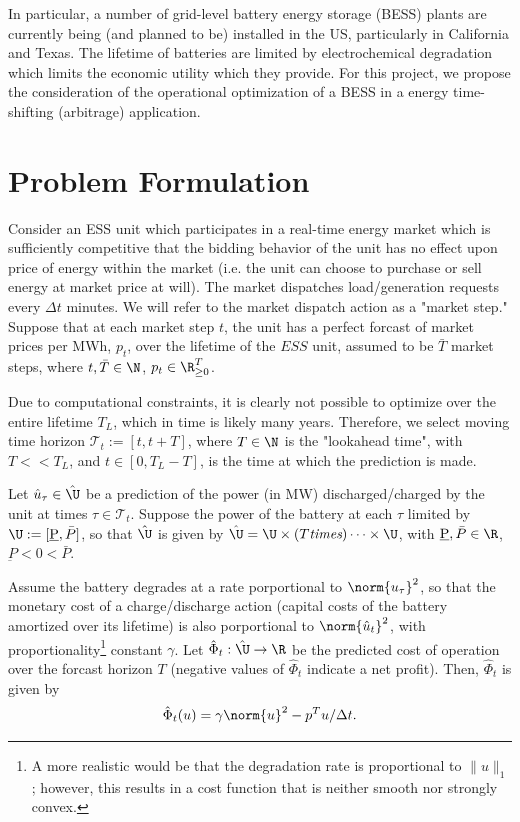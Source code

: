 \documentclass{homework}
\begin{document}
In particular, a number of grid-level battery energy storage (BESS) plants are
currently being (and planned to be) installed in the US, particularly in California and Texas.
The lifetime of batteries are limited by electrochemical degradation which limits
the economic utility which they provide.
For this project, we propose the consideration of the operational optimization of a BESS
in a energy time-shifting (arbitrage) application.

\section{Problem Formulation}

Consider an ESS unit which participates in a real-time energy market which is sufficiently
competitive that the bidding behavior of the unit has no effect upon price of energy
within the market (i.e. the unit can choose to purchase or sell energy at market price at will).
The market dispatches load/generation requests every $\Delta t$ minutes. We will
refer to the market dispatch action as a "market step." Suppose that at each market step $t$,
the unit has a perfect forcast of market prices per MWh, $p_t$, over the lifetime of the
$ESS$ unit, assumed to be $\bar{T}$ market steps, where $t,\bar{T}\in\N$, $p_t\in\R_{\geq0}^T$.

Due to computational constraints, it is clearly not possible to optimize over the
entire lifetime $T_L$, which in time is likely many years. Therefore, we select moving
time horizon $\mathcal{T}_t := [t, t + T]$, where $T\in\N$ is the "lookahead time", with $T<<T_L$,
and $t\in[0, T_L - T]$, is the time at which the prediction is made.

Let $\hat{u}_\tau\in\hat{\U}$ be a prediction of the power (in MW) discharged/charged by the unit
at times $\tau\in\mathcal{T}_t$. Suppose the power of the battery at each $\tau$
limited by $\U:=[\underbar{P}, \bar{P}]$,
so that $\hat{\U}$ is given by $\hat{\U} = \U \times (T \text{\it times}) \dots \times \U$, with
$\underbar{P}, \bar{P} \in \R$, $\underbar{P} < 0 < \bar{P}$.

Assume the battery degrades at a rate porportional to $\norm{u_\tau}^2$, so that
the monetary cost of a charge/discharge action (capital costs of the battery amortized over its
lifetime) is also porportional to $\norm{\hat{u}_t}^2$, with proportionality\footnote{
    A more realistic would be that the degradation rate is proportional to
    $\lVert u \rVert_1$; however, this results in a cost function that is neither smooth
    nor strongly convex.
} constant $\gamma$.
Let $\hat{\Phi}_t: \hat{\U} \to \R$ be the predicted cost of operation over the forcast horizon $T$
(negative values of $\hat{\Phi}_t$ indicate a net profit). Then, $\hat{\Phi}_t$ is given by
\begin{equation*}
    \hat{\Phi}_t(u) = \gamma \norm{u}^2 - p^T u / \Delta t.
\end{equation*}
\end{document}
